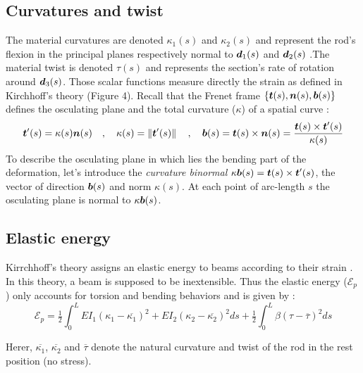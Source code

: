 \subsection{Curvatures and twist}
The material curvatures are denoted $\kappa_1(s)$ and $\kappa_2(s)$ and represent the rod’s flexion in the principal planes respectively normal to $\boldsymbol{d}_1(s)$ and $\boldsymbol{d}_2(s)$ .The material twist is denoted $\tau(s)$ and represents the section’s rate of rotation around $\boldsymbol{d}_3(s)$. Those scalar functions measure directly the strain as defined in Kirchhoff’s theory (Figure 4). Recall that the Frenet frame $\{\boldsymbol{t}(s),\boldsymbol{n}(s),\boldsymbol{b}(s)\}$ defines the osculating plane and the total curvature ($\kappa$) of a spatial curve :
\begin{equation}
	\boldsymbol{t}'(s) = \kappa(s) \boldsymbol{n}(s)
	\quad,\quad
	\kappa(s) = \left\|\boldsymbol{t}'(s)\right\|
	\quad,\quad
	\boldsymbol{b}(s) = \boldsymbol{t}(s) \times \boldsymbol{n}(s) = \frac{\boldsymbol{t}(s) \times \boldsymbol{t}'(s)}{\kappa(s)} 
\end{equation}
To describe the osculating plane in which lies the bending part of the deformation, let’s introduce the \emph{curvature binormal} $\kappa\boldsymbol{b}(s) = \boldsymbol{t}(s)\times\boldsymbol{t}'(s)$, the vector of direction $\boldsymbol{b}(s)$ and norm $\kappa(s)$. At each point of arc-length $s$ the osculating plane is normal to $\kappa\boldsymbol{b}(s)$.

\subsection{Elastic energy}
Kirrchhoff’s theory assigns an elastic energy to beams according to their strain \cite{Audoly2010}. In this theory, a beam is supposed to be inextensible. Thus the elastic energy ($\mathcal{E}_p$) only accounts for torsion and bending behaviors and is given by :
\begin{equation}
	\mathcal{E}_{p} = 
	\tfrac{1}{2} \int_{0}^{L}EI_1(\kappa_1-\overbar{\kappa_1})^2 + EI_2(\kappa_2-\overbar{\kappa_2})^2 ds
	+ \tfrac{1}{2} \int_{0}^{L} \beta(\tau -{\overbar{\tau}})^2 ds
\end{equation}

Herer, $\overbar{\kappa_1}$, $\overbar{\kappa_2}$ and $\overbar{\tau}$  denote the natural curvature and twist of the rod in the rest position (no stress).

